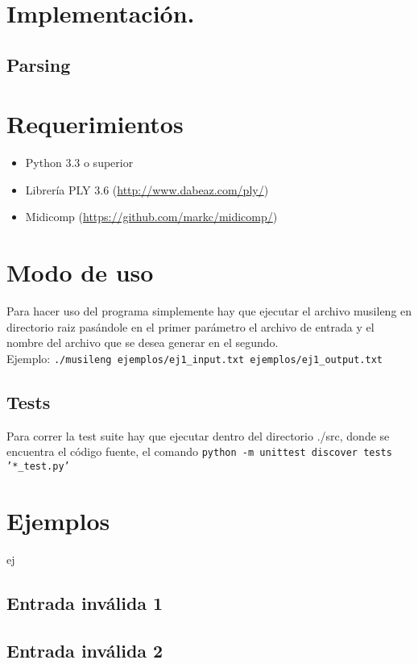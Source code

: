 \documentclass[a4paper,8pt]{article}
\begin{document}
\section{Implementación.}
\subsection{Parsing}

\section{Requerimientos}
	\begin{itemize}
  		\item Python 3.3 o superior
  		\item Librería PLY 3.6 (\url{http://www.dabeaz.com/ply/})
  		\item Midicomp (\url{https://github.com/markc/midicomp/})
	\end{itemize}

\section{Modo de uso}
Para hacer uso del programa simplemente hay que ejecutar el archivo musileng en directorio raiz pasándole en el primer parámetro el archivo de entrada y el nombre del archivo que se desea generar en el segundo. \\
Ejemplo: \texttt{./musileng ejemplos/ej1\_input.txt ejemplos/ej1\_output.txt }
\subsection{Tests}
Para correr la test suite hay que ejecutar dentro del directorio ./src, donde se encuentra el código fuente, el comando  \texttt{python -m unittest discover tests '*\_test.py'}


\section{Ejemplos}
ej
\subsection{Entrada inválida 1}
\subsection{Entrada inválida 2}
\newpage
\end{document}
